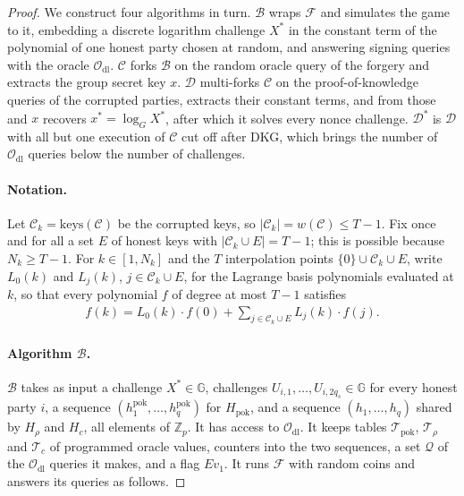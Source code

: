 \documentclass{article}
\theoremstyle{plain}
\theoremstyle{definition}
\theoremstyle{remark}
\begin{document}
\begin{proof}
  We construct four algorithms in turn.  $\mathcal{B}$ wraps $\mathcal{F}$ and simulates the game to it, embedding a discrete logarithm challenge $X^*$ in the constant term of the polynomial of one honest party chosen at random, and answering signing queries with the oracle $\mathcal{O}_{\mathrm{dl}}$.  $\mathcal{C}$ forks $\mathcal{B}$ on the random oracle query of the forgery and extracts the group secret key $x$.  $\mathcal{D}$ multi-forks $\mathcal{C}$ on the proof-of-knowledge queries of the corrupted parties, extracts their constant terms, and from those and $x$ recovers $x^* = \log_G X^*$, after which it solves every nonce challenge.  $\mathcal{D}^*$ is $\mathcal{D}$ with all but one execution of $\mathcal{C}$ cut off after DKG, which brings the number of $\mathcal{O}_{\mathrm{dl}}$ queries below the number of challenges.

  \paragraph{Notation.}  Let $\mathcal{C}_k = \mathrm{keys}(\mathcal{C})$ be the corrupted keys, so $|\mathcal{C}_k| = w(\mathcal{C}) \le T - 1$.  Fix once and for all a set $E$ of honest keys with $|\mathcal{C}_k \cup E| = T - 1$; this is possible because $N_k \ge T - 1$.  For $k \in [1, N_k]$ and the $T$ interpolation points $\{0\} \cup \mathcal{C}_k \cup E$, write $L_0(k)$ and $L_j(k)$, $j \in \mathcal{C}_k \cup E$, for the Lagrange basis polynomials evaluated at $k$, so that every polynomial $f$ of degree at most $T-1$ satisfies
  \begin{align}\label{equation:proof-interpolation}
    f(k) = L_0(k) \cdot f(0) + \sum_{j \in \mathcal{C}_k \cup E} L_j(k) \cdot f(j).
  \end{align}

  \paragraph{Algorithm $\mathcal{B}$.}  $\mathcal{B}$ takes as input a challenge $X^* \in \mathbb{G}$, challenges $U_{i,1}, \ldots, U_{i,2q_s} \in \mathbb{G}$ for every honest party $i$, a sequence $(h^{\mathrm{pok}}_1, \ldots, h^{\mathrm{pok}}_q)$ for $H_{\mathrm{pok}}$, and a sequence $(h_1, \ldots, h_q)$ shared by $H_\rho$ and $H_c$, all elements of $\mathbb{Z}_p$.  It has access to $\mathcal{O}_{\mathrm{dl}}$.  It keeps tables $\mathcal{T}_{\mathrm{pok}}$, $\mathcal{T}_\rho$ and $\mathcal{T}_c$ of programmed oracle values, counters into the two sequences, a set $\mathcal{Q}$ of the $\mathcal{O}_{\mathrm{dl}}$ queries it makes, and a flag $\mathit{Ev}_1$.  It runs $\mathcal{F}$ with random coins and answers its queries as follows.


\end{proof}
\end{document}
